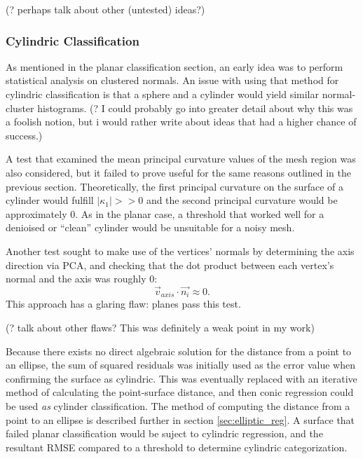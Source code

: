 (? perhaps talk about other (untested) ideas?)

\subsubsection{Cylindric Classification}

As mentioned in the planar classification section, an early idea was to perform statistical analysis on clustered normals.
An issue with using that method for cylindric classification is that a sphere and a cylinder would yield similar normal-cluster histograms.
(? I could probably go into greater detail about why this was a foolish notion, but i would rather write about ideas that had a higher chance of success.)

A test that examined the mean principal curvature values of the mesh region was also considered, but it failed to prove useful for the same reasons outlined in the previous section.
Theoretically, the first principal curvature on the surface of a cylinder would fulfill $|\kappa_1| >> 0$ and the second principal curvature would be approximately 0.
As in the planar case, a threshold that worked well for a denioised or ``clean'' cylinder would be unsuitable for a noisy mesh.

Another test sought to make use of the vertices' normals by determining the axis direction via PCA, and checking that the dot product between each vertex's normal and the axis was roughly 0:
\begin{equation}
	\vec{v}_{axis} \cdot \vec{n_i} \approx 0.
\end{equation}
This approach has a glaring flaw: planes pass this test.

(? talk about other flaws? This was definitely a weak point in my work)

Because there exists no direct algebraic solution for the distance from a point to an ellipse, the sum of squared residuals was initially used as the error value when confirming the surface as cylindric.
This was eventually replaced with an iterative method of calculating the point-surface distance, and then conic regression could be used \textit{as} cylinder classification.
The method of computing the distance from a point to an ellipse is described further in section \ref{sec:elliptic_reg}.
A surface that failed planar classification would be suject to cylindric regression, and the resultant RMSE compared to a threshold to determine cylindric categorization.

